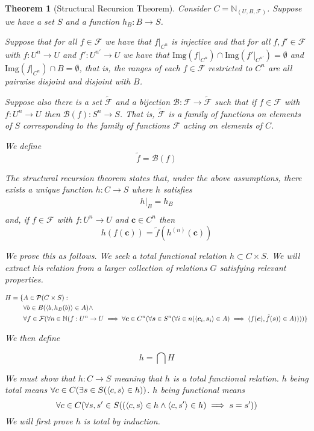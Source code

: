 \documentclass[12pt]{article}
\theoremstyle{break}
\theoremstyle{break}
\newtheorem{theorem}{Theorem}[section]
\theoremstyle{break}
\theoremstyle{break}
\theoremstyle{break}
\newtheorem{informal definition}[definition]{Informal Definition}
\newcommand{\bv}[1]{\boldsymbol{#1}}
\begin{document}
\begin{theorem}[Structural Recursion Theorem]
Consider $C = \mathbb{N}_{(U, B, \mathcal{F})}$.
Suppose we have a set $S$ and a function $h_B:B \to S$.

Suppose that for all $f\in \mathcal{F}$ we have that $f|_{C^n}$ is injective and that for all $f, f' \in \mathcal{F}$ with $f:U^n \to U$ and $f': U^{n'} \to U$ we have that $\text{Img}(f|_{C^n}) \cap \text{Img}(f'|_{C^{n'}}) = \emptyset$ and $\text{Img}(f|_{C^n}) \cap B = \emptyset$, that is, the ranges of each $f\in \mathcal{F}$ restricted to $C^n$ are all pairwise disjoint and disjoint with $B$.

Suppose also there is a set $\tilde{\mathcal{F}}$ and a bijection $\mathcal{B}: \mathcal{F} \to \tilde{\mathcal{F}}$ such that if $f\in \mathcal{F}$ with $f: U^n \to U$ then $\mathcal{B}(f): S^n \to S$.
That is, $\tilde{\mathcal{F}}$ is a family of functions on elements of $S$ corresponding to the family of functions $\mathcal{F}$ acting on elements of $C$.

We define
$$
\tilde{f} = \mathcal{B}(f)
$$

The structural recursion theorem states that, under the above assumptions, there exists a unique function $h:C \to S$ where $h$ satisfies
\begin{align*}
h|_B = h_B \\
\end{align*}
and, if $f\in \mathcal{F}$ with $f:U^n \to U$ and $\bv{c} \in C^n$ then
$$
h(f(\bv{c})) = \tilde{f}(h^{(n)}(\bv{c}))
$$

We prove this as follows.
We seek a total functional relation $h \subset C\times S$.
We will extract his relation from a larger collection of relations $G$ satisfying relevant properties.

\tiny
\begin{align*}
H = \{&A \in \mathcal{P}(C \times S): \\
&\forall b \in B (\Braket{b, h_B(b)} \in A) \land \\
&\forall f \in \mathcal{F}(\forall n \in \mathbb{N}(f:U^n \to U \implies \forall \bv{c} \in C^n (\forall \bv{s}\in S^n (\forall i \in n(\braket{\bv{c}_i, \bv{s}_i} \in A) \implies \braket{f(\bv{c}), \tilde{f}(\bv{s})}\in A))))\}
\end{align*}

\normalsize
We then define

$$
h = \bigcap H
$$

We must show that $h: C \to S$ meaning that $h$ is a total functional relation.
$h$ being total means $\forall c \in C(\exists s\in S(\braket{c, s} \in h))$.
$h$ being functional means
$$
\forall c \in C(\forall s, s' \in S((\braket{c, s}\in h \land \braket{c, s'}\in h) \implies s=s'))
$$
We will first prove $h$ is total by induction.


\end{theorem}
\end{document}
